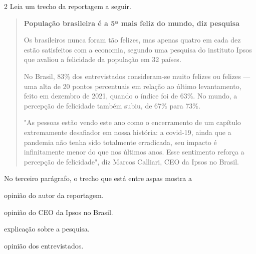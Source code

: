 \num{2} Leia um trecho da reportagem a seguir.

\begin{quote}
\textbf{População brasileira é a 5ª mais feliz do mundo, diz pesquisa}

Os brasileiros nunca foram tão felizes, mas apenas quatro em cada dez
estão satisfeitos com a economia, segundo uma pesquisa do instituto
Ipsos que avaliou a felicidade da população em 32 países.

No Brasil, 83\% dos entrevistados consideram-se muito felizes ou felizes
--- uma alta de 20 pontos percentuais em relação ao último levantamento,
feito em dezembro de 2021, quando o índice foi de 63\%. No mundo, a
percepção de felicidade também subiu, de 67\% para 73\%.

"As pessoas estão vendo este ano como o encerramento de um capítulo
extremamente desafiador em nossa história: a covid-19, ainda que a
pandemia não tenha sido totalmente erradicada, seu impacto é
infinitamente menor do que nos últimos anos. Esse sentimento reforça a
percepção de felicidade", diz Marcos Calliari, CEO da Ipsos no Brasil.

\end{quote}

No terceiro parágrafo, o trecho que está entre aspas mostra a

\begin{escolha}
\item opinião do autor da reportagem.

\item opinião do CEO da Ipsos no Brasil.

\item explicação sobre a pesquisa.

\item opinião dos entrevistados.
\end{escolha}


